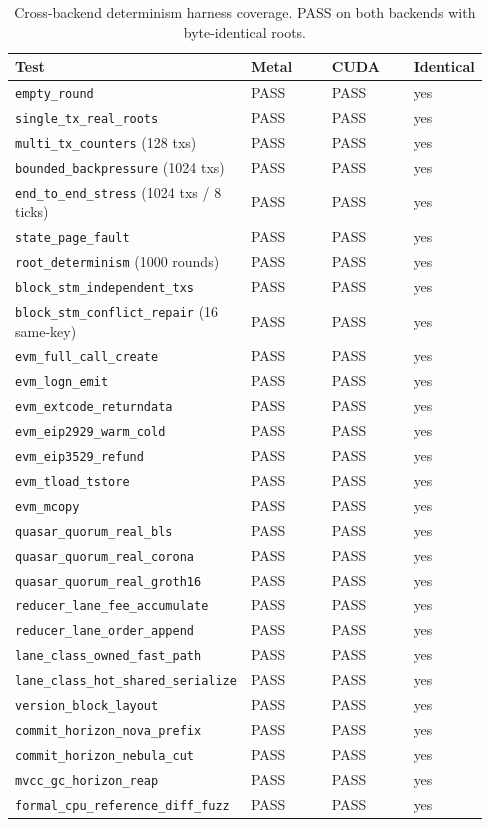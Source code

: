 \begin{table}[ht]
\centering
\small
\caption{Cross-backend determinism harness coverage. PASS on both
backends with byte-identical roots.}
\label{tab:harness}
\begin{tabular}{p{0.45\linewidth}p{0.18\linewidth}p{0.18\linewidth}p{0.13\linewidth}}
\toprule
\textbf{Test} & \textbf{Metal} & \textbf{CUDA} & \textbf{Identical} \\
\midrule
\texttt{empty\_round} & PASS & PASS & yes \\
\texttt{single\_tx\_real\_roots} & PASS & PASS & yes \\
\texttt{multi\_tx\_counters} (128 txs) & PASS & PASS & yes \\
\texttt{bounded\_backpressure} (1024 txs) & PASS & PASS & yes \\
\texttt{end\_to\_end\_stress} (1024 txs / 8 ticks) & PASS & PASS & yes \\
\texttt{state\_page\_fault} & PASS & PASS & yes \\
\texttt{root\_determinism} (1000 rounds) & PASS & PASS & yes \\
\texttt{block\_stm\_independent\_txs} & PASS & PASS & yes \\
\texttt{block\_stm\_conflict\_repair} (16 same-key) & PASS & PASS & yes \\
\texttt{evm\_full\_call\_create} & PASS & PASS & yes \\
\texttt{evm\_logn\_emit} & PASS & PASS & yes \\
\texttt{evm\_extcode\_returndata} & PASS & PASS & yes \\
\texttt{evm\_eip2929\_warm\_cold} & PASS & PASS & yes \\
\texttt{evm\_eip3529\_refund} & PASS & PASS & yes \\
\texttt{evm\_tload\_tstore} & PASS & PASS & yes \\
\texttt{evm\_mcopy} & PASS & PASS & yes \\
\texttt{quasar\_quorum\_real\_bls} & PASS & PASS & yes \\
\texttt{quasar\_quorum\_real\_corona} & PASS & PASS & yes \\
\texttt{quasar\_quorum\_real\_groth16} & PASS & PASS & yes \\
\texttt{reducer\_lane\_fee\_accumulate} & PASS & PASS & yes \\
\texttt{reducer\_lane\_order\_append} & PASS & PASS & yes \\
\texttt{lane\_class\_owned\_fast\_path} & PASS & PASS & yes \\
\texttt{lane\_class\_hot\_shared\_serialize} & PASS & PASS & yes \\
\texttt{version\_block\_layout} & PASS & PASS & yes \\
\texttt{commit\_horizon\_nova\_prefix} & PASS & PASS & yes \\
\texttt{commit\_horizon\_nebula\_cut} & PASS & PASS & yes \\
\texttt{mvcc\_gc\_horizon\_reap} & PASS & PASS & yes \\
\texttt{formal\_cpu\_reference\_diff\_fuzz} & PASS & PASS & yes \\
\bottomrule
\end{tabular}
\end{table}

